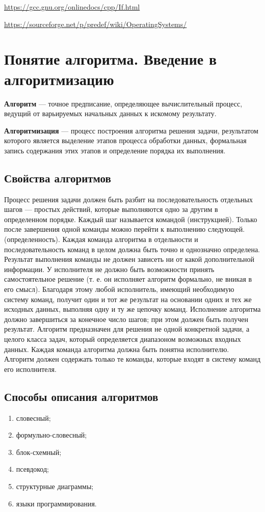 \url{https://gcc.gnu.org/onlinedocs/cpp/If.html}

\url{https://sourceforge.net/p/predef/wiki/OperatingSystems/}

\section{Понятие алгоритма. Введение в алгоритмизацию}
\textbf{Алгоритм} --- точное предписание, определяющее вычислительный процесс, ведущий от варьируемых
начальных данных к искомому результату.

\textbf{Алгоритмизация} --- процесс построения алгоритма решения задачи, результатом которого является
выделение этапов процесса обработки данных, формальная запись содержания этих этапов и определение
порядка их выполнения.

\subsection{Свойства алгоритмов}
\begin{enumerate}
   Процесс решения задачи должен быть разбит на последовательность отдельных шагов — простых действий,
  которые выполняются одно за другим в определенном порядке. Каждый шаг называется командой (инструкцией).
  Только после завершения одной команды можно перейти к выполнению следующей.
   (определенность). Каждая команда алгоритма в отдельности и последовательность команд в
  целом должна быть точно и однозначно определена. Результат выполнения команды не должен зависеть ни от какой дополнительной
  информации. У исполнителя не должно быть возможности принять самостоятельное решение (т. е. он исполняет алгоритм формально,
  не вникая в его смысл).
  Благодаря этому любой исполнитель, имеющий необходимую систему команд, получит один и тот же результат на основании одних и
  тех же исходных данных, выполняя одну и ту же цепочку команд.
   Исполнение алгоритма должно завершиться за конечное число шагов;
  при этом должен быть получен результат.
   Алгоритм предназначен для решения не одной конкретной задачи, а целого класса задач, который определяется
  диапазоном возможных входных данных.
   Каждая команда алгоритма должна быть понятна исполнителю. Алгоритм должен содержать только те команды,
  которые входят в систему команд его исполнителя.
\end{enumerate}

\subsection{Способы описания алгоритмов}
\begin{enumerate}
  \item словесный;
  \item формульно-словесный;
  \item блок-схемный;
  \item псевдокод;
  \item структурные диаграммы;
  \item языки программирования.
\end{enumerate}
